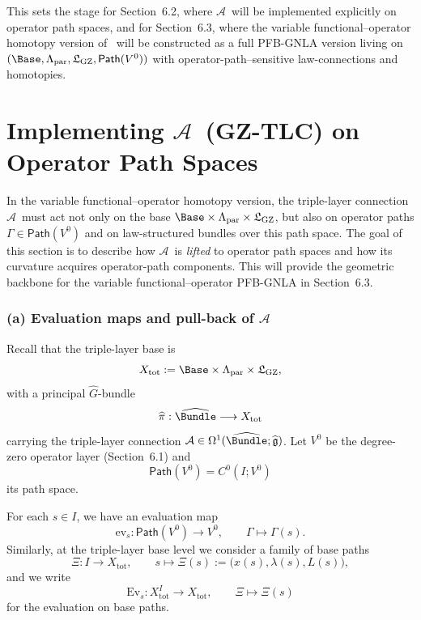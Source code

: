 \documentclass[11pt]{book}
\theoremstyle{plain}
\theoremstyle{definition}
\newcommand{\GZLS}{\ensuremath{\mathfrak{L}_{\mathrm{GZ}}}}       \newcommand{\GZLT}{\ensuremath{M_{!w}}}                           \newcommand{\GZLOC}{\ensuremath{A_M}}                             \newcommand{\GZLCurv}{\ensuremath{\mathcal{F}_{\mathrm{law}}}}
\newcommand{\GZTLCtxt}{\textsf{GZ-TLC}}                           \newcommand{\GZTLC}{\ensuremath{\mathcal{A}}}                     \newcommand{\GZGMS}{\textsf{GZ-GMS}}
\begin{document}
This sets the stage for Section~6.2, where \GZTLC\ will be implemented
explicitly on operator path spaces, and for Section~6.3, where the
variable functional–operator homotopy version of \GAlgebra\ will be
constructed as a full PFB-GNLA version living on
$(\Base,\Lambda_{\mathrm{par}},\GZLS,\mathsf{Path}(V^0))$ with
operator-path–sensitive law-connections and homotopies.



\section[Implementing \GZTLCtxt\ on Operator Path Spaces]{Implementing \GZTLC\ (\GZTLCtxt) on Operator Path Spaces}


In the variable functional–operator homotopy version, the triple-layer
connection \GZTLC\ must act not only on the base
$\Base\times\Lambda_{\mathrm{par}}\times\GZLS$, but also on operator
paths $\Gamma\in\mathsf{Path}(V^0)$ and on law-structured bundles over
this path space. The goal of this section is to describe how \GZTLC\ is
\emph{lifted} to operator path spaces and how its curvature acquires
operator-path components. This will provide the geometric backbone for
the variable functional–operator PFB-GNLA in Section~6.3.



\subsubsection*{(a) Evaluation maps and pull-back of \GZTLC}

Recall that the triple-layer base is
\[
   X_{\mathrm{tot}}
   :=
   \Base\times\Lambda_{\mathrm{par}}\times\GZLS,
\]
with a principal $\widehat{G}$-bundle
\[
   \widehat{\pi}:\widehat{\Bundle}\longrightarrow X_{\mathrm{tot}}
\]
carrying the triple-layer connection
\(
   \GZTLC\in\Omega^1(\widehat{\Bundle};\widehat{\mathfrak{g}})
\).
Let $V^0$ be the degree-zero operator layer (Section~6.1) and
\[
   \mathsf{Path}(V^0) = C^0(I;V^0)
\]
its path space.

For each $s\in I$, we have an evaluation map
\[
   \mathrm{ev}_s:
     \mathsf{Path}(V^0)
     \longrightarrow
     V^0,\qquad
   \Gamma\longmapsto \Gamma(s).
\]
Similarly, at the triple-layer base level we consider a family of base
paths
\[
   \Xi:I\longrightarrow X_{\mathrm{tot}},
   \qquad
   s\longmapsto \Xi(s)
   :=\bigl(x(s),\lambda(s),L(s)\bigr),
\]
and we write
\[
   \mathrm{Ev}_s:X_{\mathrm{tot}}^I\longrightarrow X_{\mathrm{tot}},
   \qquad
   \Xi\longmapsto \Xi(s)
\]
for the evaluation on base paths.
\end{document}
